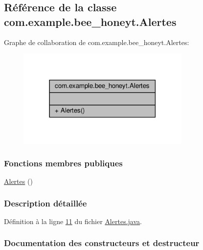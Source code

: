 \hypertarget{classcom_1_1example_1_1bee__honeyt_1_1_alertes}{}\subsection{Référence de la classe com.\+example.\+bee\+\_\+honeyt.\+Alertes}
\label{classcom_1_1example_1_1bee__honeyt_1_1_alertes}


Graphe de collaboration de com.\+example.\+bee\+\_\+honeyt.\+Alertes\+:\nopagebreak
\begin{figure}[H]
\begin{center}
\leavevmode
\includegraphics[width=242pt]{classcom_1_1example_1_1bee__honeyt_1_1_alertes__coll__graph}
\end{center}
\end{figure}
\subsubsection*{Fonctions membres publiques}
\begin{DoxyCompactItemize}
\item 
\hyperlink{classcom_1_1example_1_1bee__honeyt_1_1_alertes_a8a4cde771fa2eeea4df67f2b82b3958a}{Alertes} ()
\end{DoxyCompactItemize}


\subsubsection{Description détaillée}


Définition à la ligne \hyperlink{_alertes_8java_source_l00011}{11} du fichier \hyperlink{_alertes_8java_source}{Alertes.\+java}.



\subsubsection{Documentation des constructeurs et destructeur}
\mbox{\label{classcom_1_1example_1_1bee__honeyt_1_1_alertes_a8a4cde771fa2eeea4df67f2b82b3958a}} 
